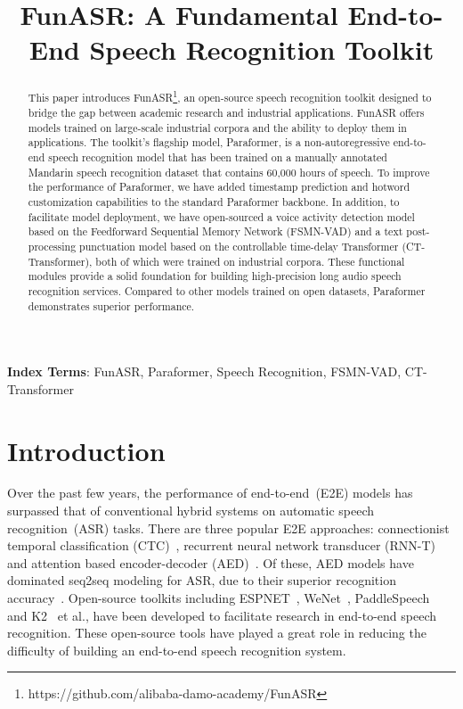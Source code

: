 \documentclass{INTERSPEECH2023}
\title{FunASR: A Fundamental End-to-End Speech Recognition Toolkit}
\begin{document}
\maketitle
 
\begin{abstract}

This paper introduces FunASR\footnote{https://github.com/alibaba-damo-academy/FunASR}, an open-source speech recognition toolkit designed to bridge the gap between academic research and industrial applications. FunASR offers models trained on large-scale industrial corpora and the ability to deploy them in applications. The toolkit's flagship model, Paraformer, is a non-autoregressive end-to-end speech recognition model that has been trained on a manually annotated Mandarin speech recognition dataset that contains 60,000 hours of speech. To improve the performance of Paraformer, we have added timestamp prediction and hotword customization capabilities to the standard Paraformer backbone. In addition, to facilitate model deployment, we have open-sourced a voice activity detection model based on the Feedforward Sequential Memory Network (FSMN-VAD) and a text post-processing punctuation model based on the controllable time-delay Transformer (CT-Transformer), both of which were trained on industrial corpora. These functional modules provide a solid foundation for building high-precision long audio speech recognition services. Compared to other models trained on open datasets, Paraformer demonstrates superior performance.


\end{abstract}
\noindent\textbf{Index Terms}: FunASR, Paraformer, Speech Recognition, FSMN-VAD, CT-Transformer



\section{Introduction}

Over the past few years, the performance of end-to-end~(E2E) models has surpassed that of conventional hybrid systems on automatic speech recognition~(ASR) tasks.
There are three popular E2E approaches: connectionist temporal classification (CTC)~\cite{graves2006connectionist}, recurrent neural network transducer (RNN-T)~\cite{graves2013speech} and attention based encoder-decoder (AED)~\cite{chan2016listen,vaswani2017attention}. 
Of these, AED models have dominated seq2seq modeling for ASR, due to their superior recognition accuracy~\cite{vaswani2017attention,gulati2020conformer,gao2020san,zhang2020streaming,gao2020universal,radfar22_interspeech,sklyar22_interspeech,do22_interspeech,lee22g_interspeech,zhao22f_interspeech}. 
Open-source toolkits including ESPNET~\cite{watanabe2018espnet}, WeNet~\cite{yao2021wenet}, PaddleSpeech~\cite{zhang2022paddlespeech} and K2~\cite{kang2022fast} et al., have been developed to facilitate research in end-to-end speech recognition. These open-source tools have played a great role in reducing the difficulty of building an end-to-end speech recognition system.
\end{document}
